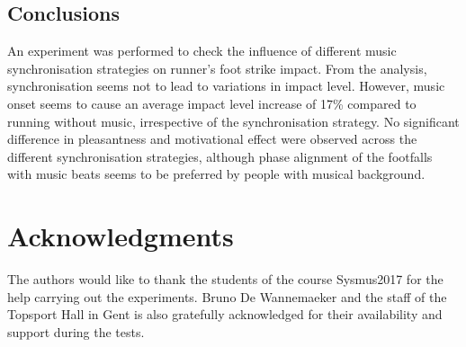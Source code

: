 \documentclass[10pt,letterpaper]{article}
\begin{document}

\subsection*{Conclusions}

An experiment was performed to check the influence of different music synchronisation strategies on runner's foot strike impact. From the analysis, synchronisation seems not to lead to variations in impact level. However, music onset seems to cause an average impact level increase of 17\% compared to running without music, irrespective of the synchronisation strategy.
No significant difference in pleasantness and motivational effect were observed across the different synchronisation strategies, although phase alignment of the footfalls with music beats seems to be preferred by people with musical background. 



\section*{Acknowledgments}
The authors would like to thank the students of the course Sysmus2017 for the help carrying out the experiments. Bruno De Wannemaeker and the staff of the Topsport Hall in Gent is also gratefully acknowledged for their availability and support during the tests.
\nolinenumbers

%
%
% 



\end{document}
